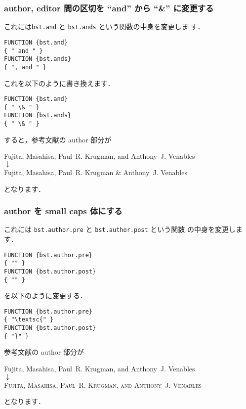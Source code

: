 \documentclass[a4j,10pt]{jarticle}
\begin{document}
\subsubsection{author, editor 間の区切を ``and'' から ``\&'' に変更する}

これには\texttt{bst.and} と \texttt{bst.ands} という関数の中身を変更しま
す．
\begin{screen}
\begin{verbatim}
FUNCTION {bst.and}
{ " and " }
FUNCTION {bst.ands}
{ ", and " }
\end{verbatim}
\end{screen}

これを以下のように書き換えます．
\begin{screen}
\begin{verbatim}
FUNCTION {bst.and}
{ " \& " }
FUNCTION {bst.ands}
{ " \& " }
\end{verbatim}
\end{screen}

すると，参考文献の author 部分が
\begin{center}
Fujita, Masahisa, Paul~R. Krugman, and Anthony~J. Venables \\
 $\downarrow$ \\
Fujita, Masahisa, Paul~R. Krugman \& Anthony~J. Venables 
\end{center}
となります．

\subsubsection{author を small caps 体にする}

これには \texttt{bst.author.pre} と \texttt{bst.author.post} という関数
の中身を変更します．

\begin{screen}
\begin{verbatim}
FUNCTION {bst.author.pre}
{ "" }
FUNCTION {bst.author.post}
{ "" }
\end{verbatim}
\end{screen}
を以下のように変更する．
\begin{screen}
\begin{verbatim}
FUNCTION {bst.author.pre}
{ "\textsc{" }
FUNCTION {bst.author.post}
{ "}" }
\end{verbatim}
\end{screen}

参考文献の author 部分が
\begin{center}
Fujita, Masahisa, Paul~R. Krugman, and Anthony~J. Venables \\
 $\downarrow$ \\
\textsc{Fujita, Masahisa, Paul~R. Krugman, and Anthony~J. Venables}
\end{center}
となります．
\end{document}
